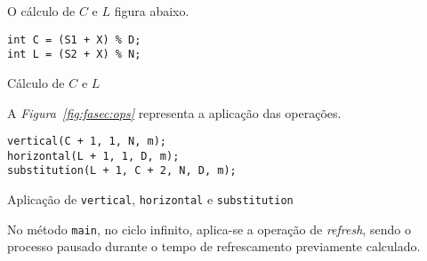 O cálculo de $C$ e $L$ figura abaixo.

\begin{center}
\begin{verbatim}
int C = (S1 + X) % D;
int L = (S2 + X) % N;
\end{verbatim}
 	\captionsetup{type=figure, width=0.8\linewidth}
	\caption{Cálculo de $C$ e $L$}
\label{fig:fasec:} 
\end{center}


A \emph{Figura~\ref{fig:fasec:ops}} representa a aplicação das operações. 

\begin{center}
\begin{verbatim}
vertical(C + 1, 1, N, m);
horizontal(L + 1, 1, D, m);
substitution(L + 1, C + 2, N, D, m);
\end{verbatim}
 	\captionsetup{type=figure, width=0.8\linewidth}
	\caption{Aplicação de \texttt{vertical}, \texttt{horizontal}
	e \texttt{substitution}}
\label{fig:fasec:ops} 
\end{center}

No método \texttt{main}, no ciclo infinito, aplica-se a operação de
\emph{refresh}, sendo o processo pausado durante o tempo de refrescamento
previamente calculado.

